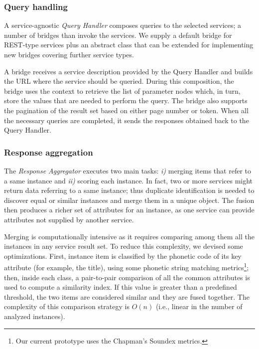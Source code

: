 \subsubsection{Query handling}

A service-agnostic \emph{Query Handler} composes queries to the selected services; a number of bridges than invoke the services. We supply a default bridge for REST-type services plus an abstract class that can be extended for implementing new
bridges covering further service types. 

A bridge receives a service description
provided by the Query Handler and builds the URL where the
service should be queried. During this composition, the bridge uses the context to
retrieve the list of parameter nodes which, in turn, store the values
that are needed to perform the query.
The bridge also supports the pagination of the result set based on either page number or token. When all the
necessary queries are completed, it sends  the
responses obtained back to the Query Handler.

\subsubsection{Response aggregation}

The \emph{Response Aggregator} executes two main tasks: \emph{i)} merging
items that refer to a same instance and \emph{ii)} scoring each instance.
In fact, two or more services
might return data referring to a same instance; thus duplicate
identification is needed to discover equal or similar instances and merge them
in a unique object. The fusion then produces a richer
set of attributes for an instance, as one service can provide
attributes not supplied by another service. 


Merging is computationally intensive as it requires comparing among them all the instances in any service result set. To reduce this complexity, 
we devised some optimizations. First, instance item is classified by
the phonetic code of its key attribute (for example, the title), using some phonetic string matching metrics\footnote{Our current prototype uses the Chapman's Soundex metrics\cite{Zobel:1996}.}; then, inside each class,
a pair-to-pair comparison of all the common attributes is used to compute a
similarity index. If this value is greater than a predefined
threshold, the two items are considered similar and they are fused
together. The complexity of this comparison strategy is $O(n)$ (i.e., linear in the number of analyzed instances). 

